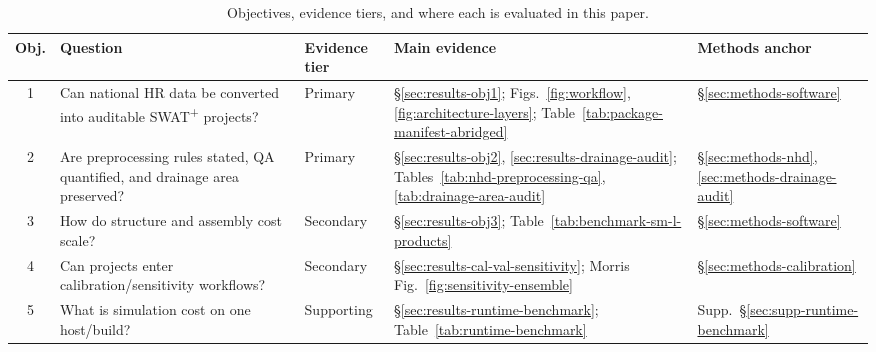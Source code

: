 \begin{table}[htbp]
  \centering
  \caption{Objectives, evidence tiers, and where each is evaluated in this paper.}
  \label{tab:objective-evidence-map}
  \footnotesize
  \setlength{\tabcolsep}{4pt}
  \renewcommand{\arraystretch}{1.18}
  \begin{tabularx}{\textwidth}{@{}c >{\RaggedRight\arraybackslash}X >{\RaggedRight\arraybackslash}p{1.5cm} >{\RaggedRight\arraybackslash}p{3.0cm} >{\RaggedRight\arraybackslash}p{2.3cm}@{}}
    \toprule
    Obj. & Question & Evidence tier & Main evidence & Methods anchor \\
    \midrule
    1 & Can national HR data be converted into auditable SWAT\textsuperscript{+} projects? & Primary & \S\ref{sec:results-obj1}; Figs.~\ref{fig:workflow}, \ref{fig:architecture-layers}; Table~\ref{tab:package-manifest-abridged} & \S\ref{sec:methods-software} \\
    2 & Are preprocessing rules stated, QA quantified, and drainage area preserved? & Primary & \S\ref{sec:results-obj2}, \ref{sec:results-drainage-audit}; Tables~\ref{tab:nhd-preprocessing-qa}, \ref{tab:drainage-area-audit} & \S\ref{sec:methods-nhd}, \ref{sec:methods-drainage-audit} \\
    3 & How do structure and assembly cost scale? & Secondary & \S\ref{sec:results-obj3}; Table~\ref{tab:benchmark-sm-l-products} & \S\ref{sec:methods-software} \\
    4 & Can projects enter calibration/sensitivity workflows? & Secondary & \S\ref{sec:results-cal-val-sensitivity}; Morris Fig.~\ref{fig:sensitivity-ensemble} & \S\ref{sec:methods-calibration} \\
    5 & What is simulation cost on one host/build? & Supporting & \S\ref{sec:results-runtime-benchmark}; Table~\ref{tab:runtime-benchmark} & Supp.~\S\ref{sec:supp-runtime-benchmark} \\
    \bottomrule
  \end{tabularx}
\end{table}
